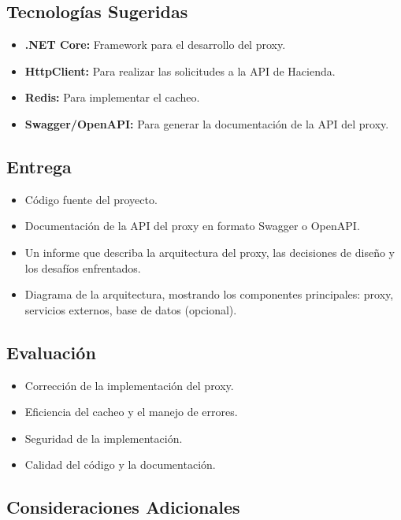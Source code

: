 \documentclass[
]{agujournal2019}
\begin{document}
\subsection{Tecnologías Sugeridas}\label{tecnologuxedas-sugeridas}

\begin{itemize}
\item
  \textbf{.NET Core:} Framework para el desarrollo del proxy.
\item
  \textbf{HttpClient:} Para realizar las solicitudes a la API de
  Hacienda.
\item
  \textbf{Redis:} Para implementar el cacheo.
\item
  \textbf{Swagger/OpenAPI:} Para generar la documentación de la API del
  proxy.
\end{itemize}

\subsection{Entrega}\label{entrega}

\begin{itemize}
\item
  Código fuente del proyecto.
\item
  Documentación de la API del proxy en formato Swagger o OpenAPI.
\item
  Un informe que describa la arquitectura del proxy, las decisiones de
  diseño y los desafíos enfrentados.
\item
  Diagrama de la arquitectura, mostrando los componentes principales:
  proxy, servicios externos, base de datos (opcional).
\end{itemize}

\subsection{Evaluación}\label{evaluaciuxf3n}

\begin{itemize}
\item
  Corrección de la implementación del proxy.
\item
  Eficiencia del cacheo y el manejo de errores.
\item
  Seguridad de la implementación.
\item
  Calidad del código y la documentación.
\end{itemize}

\subsection{Consideraciones
Adicionales}\label{consideraciones-adicionales}
\end{document}
